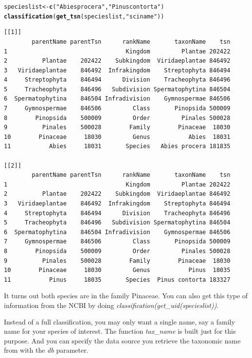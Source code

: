 \documentclass[letterpaper,superscriptaddress,showkeys,longbibliography,10pt]{revtex4-1}\usepackage{graphicx, color}
\makeatletter
\newcommand{\hlfunctioncall}[1]{\textcolor[rgb]{0.501960784313725,0,0.329411764705882}{\textbf{#1}}}%
\newcommand{\hlstring}[1]{\textcolor[rgb]{0.6,0.6,1}{#1}}%
\newenvironment{kframe}{%
 \def\at@end@of@kframe{}%
 \ifinner\ifhmode%
  \def\at@end@of@kframe{\end{minipage}}%
  \begin{minipage}{\columnwidth}%
 \fi\fi%
 \def\FrameCommand##1{\hskip\@totalleftmargin \hskip-\fboxsep
 \colorbox{shadecolor}{##1}\hskip-\fboxsep
     \hskip-\linewidth \hskip-\@totalleftmargin \hskip\columnwidth}%
 \MakeFramed {\advance\hsize-\width
   \@totalleftmargin\z@ \linewidth\hsize
   \@setminipage}}%
 {\par\unskip\endMakeFramed%
 \at@end@of@kframe}
\newenvironment{knitrout}{}{} %
\makeatother
\begin{document}
\begin{knitrout}
\color{fgcolor}\begin{kframe}
\begin{alltt}
specieslist <- \hlfunctioncall{c}(\hlstring{"Abies procera"}, \hlstring{"Pinus contorta"})
\hlfunctioncall{classification}(\hlfunctioncall{get_tsn}(specieslist, \hlstring{"sciname"}))
\end{alltt}
\begin{verbatim}
[[1]]
        parentName parentTsn      rankName       taxonName    tsn
1                                  Kingdom         Plantae 202422
2          Plantae    202422    Subkingdom  Viridaeplantae 846492
3   Viridaeplantae    846492  Infrakingdom    Streptophyta 846494
4     Streptophyta    846494      Division    Tracheophyta 846496
5     Tracheophyta    846496   Subdivision Spermatophytina 846504
6  Spermatophytina    846504 Infradivision    Gymnospermae 846506
7     Gymnospermae    846506         Class       Pinopsida 500009
8        Pinopsida    500009         Order         Pinales 500028
9          Pinales    500028        Family        Pinaceae  18030
10        Pinaceae     18030         Genus           Abies  18031
11           Abies     18031       Species   Abies procera 181835

[[2]]
        parentName parentTsn      rankName       taxonName    tsn
1                                  Kingdom         Plantae 202422
2          Plantae    202422    Subkingdom  Viridaeplantae 846492
3   Viridaeplantae    846492  Infrakingdom    Streptophyta 846494
4     Streptophyta    846494      Division    Tracheophyta 846496
5     Tracheophyta    846496   Subdivision Spermatophytina 846504
6  Spermatophytina    846504 Infradivision    Gymnospermae 846506
7     Gymnospermae    846506         Class       Pinopsida 500009
8        Pinopsida    500009         Order         Pinales 500028
9          Pinales    500028        Family        Pinaceae  18030
10        Pinaceae     18030         Genus           Pinus  18035
11           Pinus     18035       Species  Pinus contorta 183327
\end{verbatim}
\end{kframe}
\end{knitrout}


It turns out both species are in the family Pinaceae. You can also get this type of information from the NCBI by doing \emph{classification(get\_uid(specieslist))}.

Instead of a full classification, you may only want a single name, say a family name for your species of interest. The function \emph{tax\_name} is built just for this purpose. And you can specify the data source you retrieve the taxonomic name from with the \emph{db} parameter. 
\end{document}
